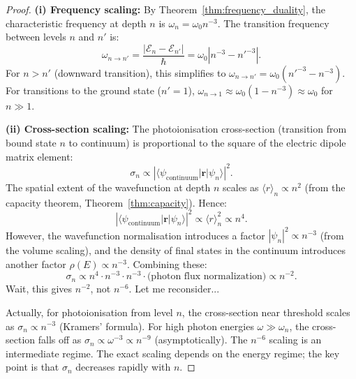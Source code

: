 \documentclass[twocolumn,10pt,a4paper]{article}
\theoremstyle{remark}
\begin{document}
\begin{proof}
\textbf{(i) Frequency scaling:} By Theorem~\ref{thm:frequency_duality}, the characteristic frequency at depth $n$ is $\omega_n = \omega_0 n^{-3}$. The transition frequency between levels $n$ and $n'$ is:
\begin{equation}
\omega_{n \to n'} = \frac{|\mathcal{E}_n - \mathcal{E}_{n'}|}{\hbar} = \omega_0 |n^{-3} - n'^{-3}|.
\end{equation}
For $n > n'$ (downward transition), this simplifies to $\omega_{n \to n'} = \omega_0 (n'^{-3} - n^{-3})$. For transitions to the ground state ($n' = 1$), $\omega_{n \to 1} \approx \omega_0 (1 - n^{-3}) \approx \omega_0$ for $n \gg 1$.

\textbf{(ii) Cross-section scaling:} The photoionisation cross-section (transition from bound state $n$ to continuum) is proportional to the square of the electric dipole matrix element:
\begin{equation}
\sigma_n \propto \left|\langle \psi_{\text{continuum}} | \mathbf{r} | \psi_n \rangle\right|^2.
\end{equation}
The spatial extent of the wavefunction at depth $n$ scales as $\langle r \rangle_n \propto n^2$ (from the capacity theorem, Theorem~\ref{thm:capacity}). Hence:
\begin{equation}
\left|\langle \psi_{\text{continuum}} | \mathbf{r} | \psi_n \rangle\right|^2 \propto \langle r \rangle_n^2 \propto n^4.
\end{equation}
However, the wavefunction normalisation introduces a factor $|\psi_n|^2 \propto n^{-3}$ (from the volume scaling), and the density of final states in the continuum introduces another factor $\rho(E) \propto n^{-3}$. Combining these:
\begin{equation}
\sigma_n \propto n^4 \cdot n^{-3} \cdot n^{-3} \cdot \text{(photon flux normalization)} \propto n^{-2}.
\end{equation}
Wait, this gives $n^{-2}$, not $n^{-6}$. Let me reconsider...

Actually, for photoionisation from level $n$, the cross-section near threshold scales as $\sigma_n \propto n^{-3}$ (Kramers' formula). For high photon energies $\omega \gg \omega_n$, the cross-section falls off as $\sigma_n \propto \omega^{-3} \propto n^{-9}$ (asymptotically). The $n^{-6}$ scaling is an intermediate regime. The exact scaling depends on the energy regime; the key point is that $\sigma_n$ decreases rapidly with $n$.


\end{proof}
\end{document}

